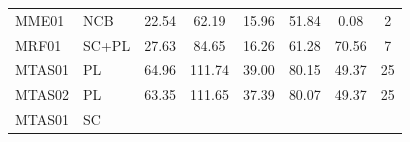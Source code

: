 \documentclass[11pt,a4paper]{article}
\begin{document}
\begin{table}[H]
\begin{tabular}{llcccccc}
    \\

    MME01 &
    NCB &

    
        22.54
     &

    
        62.19
     &

    
        15.96
     &

    
        51.84
     &

    
        0.08
     &

    
        2
    
    \\

    MRF01 &
    SC+PL &

    
        27.63
     &

    
        84.65
     &

    
        16.26
     &

    
        61.28
     &

    
        70.56
     &

    
        7
    
    \\

    MTAS01 &
    PL &

    
        64.96
     &

    
        111.74
     &

    
        39.00
     &

    
        80.15
     &

    
        49.37
     &

    
        25
    
    \\

    MTAS02 &
    PL &

    
        63.35
     &

    
        111.65
     &

    
        37.39
     &

    
        80.07
     &

    
        49.37
     &

    
        25
    
    \\

    MTAS01 &
    SC &


\end{tabular}
\end{table}
\end{document}
